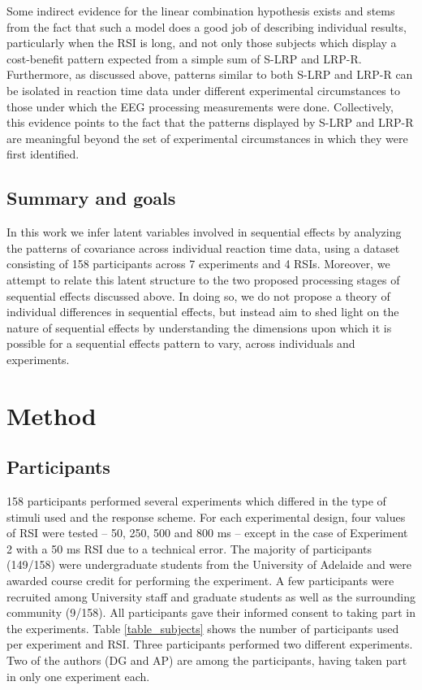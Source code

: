 \documentclass{apa}[12pt]
\begin{document}
Some indirect evidence for the linear combination hypothesis exists and stems from the fact that such a model does a good job of describing individual results, particularly when the RSI is long, and not only those subjects which display a cost-benefit pattern expected from a simple sum of S-LRP and LRP-R. Furthermore, as discussed above, patterns similar to both S-LRP and LRP-R can be isolated in reaction time data under different experimental circumstances to those under which the EEG processing measurements were done. Collectively, this evidence points to the fact that the patterns displayed by S-LRP and LRP-R are meaningful beyond the set of experimental circumstances in which they were first identified.

\subsection{Summary and goals}

In this work we infer latent variables involved in sequential effects by analyzing the patterns of covariance across individual reaction time data, using a dataset consisting of 158 participants across 7 experiments and 4 RSIs. Moreover, we attempt to relate this latent structure to the two proposed processing stages of sequential effects discussed above. In doing so, we do not propose a theory of individual differences in sequential effects, but instead aim to shed light on the nature of sequential effects by understanding the dimensions upon which it is possible for a sequential effects pattern to vary, across individuals and experiments.

\section{Method}

\subsection{Participants}

158 participants performed several experiments which differed in the type of stimuli used and the response scheme. For each experimental design, four values of RSI were tested -- 50, 250, 500 and 800 ms -- except in the case of Experiment 2 with a 50 ms RSI due to a technical error. The majority of participants (149/158) were undergraduate students from the University of Adelaide and were awarded course credit for performing the experiment. A few participants were recruited among University staff and graduate students as well as the surrounding community (9/158). All participants gave their informed consent to taking part in the experiments. Table \ref{table_subjects} shows the number of participants used per experiment and RSI. Three participants performed two different experiments. Two of the authors (DG and AP) are among the participants, having taken part in only one experiment each.
\end{document}

